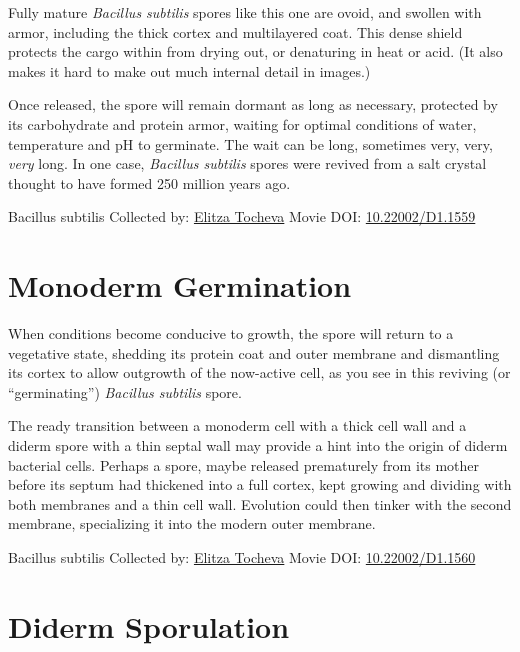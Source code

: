 \documentclass[]{tufte-book}
\begin{document}
Fully mature \emph{Bacillus subtilis} spores like this one are ovoid, and swollen with armor, including the thick cortex and multilayered coat. This dense shield protects the cargo within from drying out, or denaturing in heat or acid. (It also makes it hard to make out much internal detail in images.)

Once released, the spore will remain dormant as long as necessary, protected by its carbohydrate and protein armor, waiting for optimal conditions of water, temperature and pH to germinate. The wait can be long, sometimes very, very, \emph{very} long. In one case, \emph{Bacillus subtilis} spores were revived from a salt crystal thought to have formed 250 million years ago.



\hypertarget{htmlwidget-5d3dba721ce694e89cff}{}

\label{fig:8-7}Bacillus subtilis Collected by: \protect\hyperlink{elitza_tocheva}{Elitza Tocheva} Movie DOI: \href{https://doi.org/10.22002/D1.1559}{10.22002/D1.1559}

\hypertarget{monoderm-germination}{%
\section{Monoderm Germination}\label{monoderm-germination}}

When conditions become conducive to growth, the spore will return to a vegetative state, shedding its protein coat and outer membrane and dismantling its cortex to allow outgrowth of the now-active cell, as you see in this reviving (or ``germinating'') \emph{Bacillus subtilis} spore.

The ready transition between a monoderm cell with a thick cell wall and a diderm spore with a thin septal wall may provide a hint into the origin of diderm bacterial cells. Perhaps a spore, maybe released prematurely from its mother before its septum had thickened into a full cortex, kept growing and dividing with both membranes and a thin cell wall. Evolution could then tinker with the second membrane, specializing it into the modern outer membrane.



\hypertarget{htmlwidget-1425abb8b245f319b996}{}

\label{fig:8-8}Bacillus subtilis Collected by: \protect\hyperlink{elitza_tocheva}{Elitza Tocheva} Movie DOI: \href{https://doi.org/10.22002/D1.1560}{10.22002/D1.1560}

\hypertarget{diderm-sporulation}{%
\section{Diderm Sporulation}\label{diderm-sporulation}}
\end{document}
